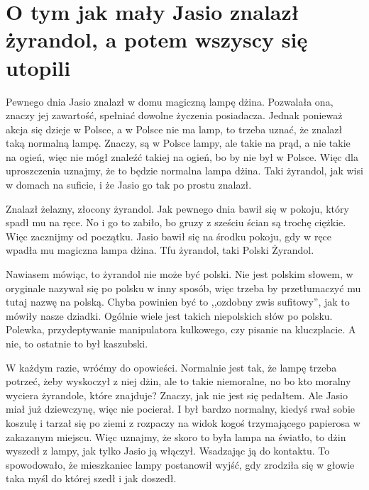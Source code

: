 \chapter{O tym jak mały Jasio znalazł żyrandol, a potem wszyscy się utopili}


Pewnego dnia Jasio znalazł w domu magiczną lampę dżina.
Pozwalała ona, znaczy jej zawartość, spełniać dowolne życzenia posiadacza.
Jednak ponieważ akcja się dzieje w Polsce, a w Polsce nie ma lamp, to trzeba uznać, że znalazł taką normalną lampę.
Znaczy, są w Polsce lampy, ale takie na prąd, a nie takie na ogień, więc nie mógł znaleźć takiej na ogień, bo by nie był w Polsce.
Więc dla uproszczenia uznajmy, że to będzie normalna lampa dżina. Taki żyrandol, jak wisi w domach na suficie, i że Jasio go tak po prostu znalazł. 

Znalazł żelazny, złocony żyrandol. Jak pewnego dnia bawił się w pokoju, który spadł mu na ręce.
No i go to zabiło, bo gruzy z sześciu ścian są trochę ciężkie. Więc zacznijmy od początku.
Jasio bawił się na środku pokoju, gdy w ręce wpadła mu magiczna lampa dżina. Tfu żyrandol, taki Polski Żyrandol.

Nawiasem mówiąc, to żyrandol nie może być polski.
Nie jest polskim słowem, w oryginale nazywał się po polsku w inny sposób, więc trzeba by przetłumaczyć mu tutaj nazwę na polską.
Chyba powinien być to ,,ozdobny zwis sufitowy'', jak to mówiły nasze dziadki.
Ogólnie wiele jest takich niepolskich słów po polsku. Polewka, przydeptywanie manipulatora kulkowego, czy pisanie na kluczplacie.
A nie, to ostatnie to był kaszubski.

W każdym razie, wróćmy do opowieści.
Normalnie jest tak, że lampę trzeba potrzeć, żeby wyskoczył z niej dżin, ale to takie niemoralne, no bo kto moralny wyciera żyrandole, które znajduje?
Znaczy, jak nie jest się pedałtem. Ale Jasio miał już dziewczynę, więc nie pocierał.
I był bardzo normalny, kiedyś rwał sobie koszulę i tarzał się po ziemi z rozpaczy na widok kogoś trzymającego papierosa w zakazanym miejscu.
Więc uznajmy, że skoro to była lampa na światło, to dżin wyszedł z lampy, jak tylko Jasio ją włączył. Wsadzając ją do kontaktu.
To spowodowało, że mieszkaniec lampy postanowił wyjść, gdy zrodziła się w głowie taka myśl do której szedł i jak doszedł.

